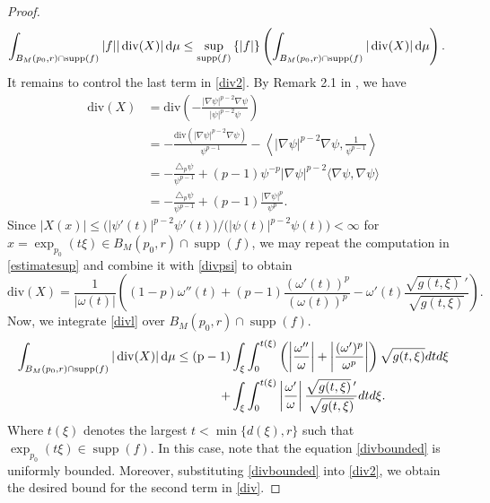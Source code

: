 \documentclass{article}
\begin{document}
\begin{proof}
\begin{equation}
\begin{aligned}
\int_{B_M(p_0,r)\cap\operatorname{supp}(f)} |f| |\operatorname{div}(X)| \, \rm{d}\mu &\leq  \sup_{\operatorname{supp}(f)}\left\{ |f| \right\} \left( \int_{B_M(p_0,r)\cap\operatorname{supp}(f)} |\operatorname{div}(X)|  \, \rm{d}\mu \right). 
\end{aligned}
\end{equation}
It remains to control the last term in \eqref{div2}. By Remark 2.1 in \cite{LimaMontenegroSantos2010}, we have
\begin{equation}\label{divpsi}
    \begin{aligned}
        \mathrm{div}(X) &= \mathrm{div} \left(- \frac{|\nabla \psi|^{p-2}\nabla \psi}{|\psi|^{p-2}\psi} \right) \\
        &= - \frac{\mathrm{div} \left( |\nabla \psi|^{p-2}\nabla \psi \right)}{\psi^{p-1}} - \left\langle  |\nabla \psi|^{p-2}\nabla \psi, \frac{1}{\psi^{p-1}}  \right\rangle \\
        &= -\frac{\triangle_p \psi}{\psi^{p-1}} + (p-1) \psi^{-p} |\nabla \psi|^{p-2}\langle \nabla \psi, \nabla \psi \rangle \\
        &= -\frac{\triangle_p \psi}{\psi^{p-1}} + (p-1) \frac{|\nabla \psi|^{p}}{\psi^p}.
    \end{aligned}
\end{equation}
Since \( |X(x)| \leq \bigl(|\psi'(t)|^{p-2}\psi'(t)\bigr)\big/\bigl(|\psi(t)|^{p-2}\psi(t)\bigr) < \infty\) for \( x = \exp_{p_0}(t\xi) \in B_M(p_0,r)\cap \operatorname{supp}(f) \), we may repeat the computation in \eqref{estimatesup} and combine it with \eqref{divpsi} to obtain
\begin{equation}\label{divl}
\mathrm{div}(X)  = \frac{1}{|\omega(t)|} \left( (1-p)\omega''(t) + (p-1)\dfrac{(\omega'(t))^p}{(\omega(t))^p} - \omega'(t) \frac{\sqrt{g(t,\xi)}\,'}{\sqrt{g(t,\xi)}} \right).
\end{equation}
Now, we integrate \eqref{divl} over $B_M(p_0,r)\cap \operatorname{supp}(f)$.
\begin{equation}\label{divbounded}
\begin{aligned}
         \int_{B_M(p_0,r)\cap\operatorname{supp}(f)} |\operatorname{div}(X)|  \, \rm{d}\mu  \leq  (p-1)&\int_\xi \int_0^{t(\xi)} \left( \left |\dfrac{\omega''}{\omega}\right| +  \left |\dfrac{(\omega')^p}{\omega^p}\right|\right)\sqrt{g(t,\xi)} dtd\xi \\
         +& \int_\xi \int_0^{t(\xi)} \left| \frac{\omega'}{\omega} \right| \frac{\sqrt{g(t,\xi)}\,'}{\sqrt{g(t,\xi)}} dtd\xi. 
         \end{aligned}
\end{equation}
Where $t(\xi)$ denotes the largest $t < \min\{d(\xi), r\}$ such that
$\exp_{p_0}(t\xi) \in \operatorname{supp}(f)$. In this case, note that the equation \eqref{divbounded} is uniformly bounded. Moreover, substituting \eqref{divbounded} into \eqref{div2}, we obtain the desired bound for the second term in \eqref{div}.
\end{proof}
\end{document}

